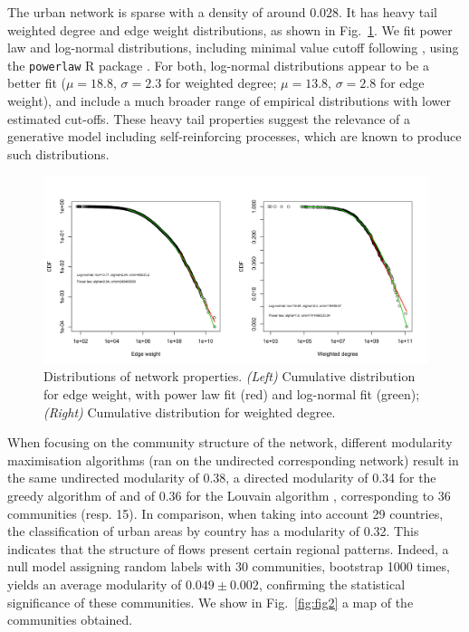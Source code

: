 \documentclass[10pt,letterpaper]{article}
\begin{document}

The urban network is sparse with a density of around $0.028$. It has heavy tail weighted degree and edge weight distributions, as shown in Fig.~\ref{fig:nwdist}. We fit power law and log-normal distributions, including minimal value cutoff following \cite{clauset2009power}, using the \texttt{powerlaw} R package \cite{powerlawpackage}. For both, log-normal distributions appear to be a better fit ($\mu=18.8$, $\sigma=2.3$ for weighted degree; $\mu=13.8$, $\sigma=2.8$ for edge weight), and include a much broader range of empirical distributions with lower estimated cut-offs. These heavy tail properties suggest the relevance of a generative model including self-reinforcing processes, which are known to produce such distributions.

\begin{figure}
    \begin{center}
        \includegraphics[width=\linewidth]{figures/Fig1.png}
    \end{center}
    \vspace{2cm}
    \caption{Distributions of network properties. \textit{(Left)} Cumulative distribution for edge weight, with power law fit (red) and log-normal fit (green); \textit{(Right)} Cumulative distribution for weighted degree.}
    \label{fig:nwdist}
\end{figure}


When focusing on the community structure of the network, different modularity maximisation algorithms (ran on the undirected corresponding network) result in the same undirected modularity of 0.38, a directed modularity \cite{nicosia2009extending} of 0.34 for the greedy algorithm of \cite{clauset2004finding} and of 0.36 for the Louvain algorithm \cite{blondel2008fast}, corresponding to 36 communities (resp. 15). In comparison, when taking into account 29 countries, the classification of urban areas by country has a modularity of 0.32. This indicates that the structure of flows present certain regional patterns. Indeed, a null model assigning random labels with 30 communities, bootstrap 1000 times, yields an average modularity of $0.049 \pm 0.002$, confirming the statistical significance of these communities. We show in Fig.~\ref{fig:fig2} a map of the communities obtained.
\end{document}
